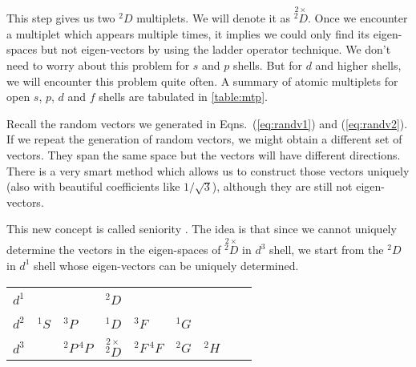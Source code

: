 %
This step gives us two $^2D$ multiplets. We will denote it as $\stackrel{2\times}{^{2}D}$.
Once we encounter a multiplet which appears multiple times, it implies we could only find its
eigen-spaces but not eigen-vectors by using the ladder operator technique. We don't need to
worry about this problem for $s$ and $p$ shells. But for $d$ and higher shells, we will encounter
this problem quite often. A summary of atomic multiplets for open $s$, $p$, $d$ and $f$ shells
are tabulated in \ref{table:mtp}.

Recall the random vectors we generated in Eqns.~(\ref{eq:randv1}) and (\ref{eq:randv2}).
If we repeat the generation of random vectors, we might obtain a different set of vectors. They
span the same space but the vectors will have different directions. There is a very smart
method which allows us to construct those vectors uniquely (also with beautiful coefficients
like $1/\sqrt{3}$), although they are still not eigen-vectors.

This new concept is called seniority \cite{RIII}. The idea is that since we cannot uniquely determine
the vectors in the eigen-spaces of $\stackrel{2\times}{^{2}D}$ in $d^3$ shell, we start from
the $^2D$ in $d^1$ shell whose eigen-vectors can be uniquely determined.

\begin{center}
\begin{tabular}{l|l l l l l l l l}
\hline
 $d^1$ & & & $\boxed{^{2}D}$ & $\phantom{\stackrel{2\times}{^{2}D}}$ \\
 $d^2$ & $^{1}S$ & $^{3}P$ & $^{1}D$ & $^{3}F$ & $^{1}G$ & $\phantom{\stackrel{2\times}{^{2}D}}$ \\
 $d^3$ & & $^{2}P\,^{4}P$ & $\boxed{\stackrel{2\times}{^{2}D}}$ & $^{2}F\,^{4}F$ & $^{2}G$ & $^{2}H$ \\
\hline
\end{tabular}
\end{center}

